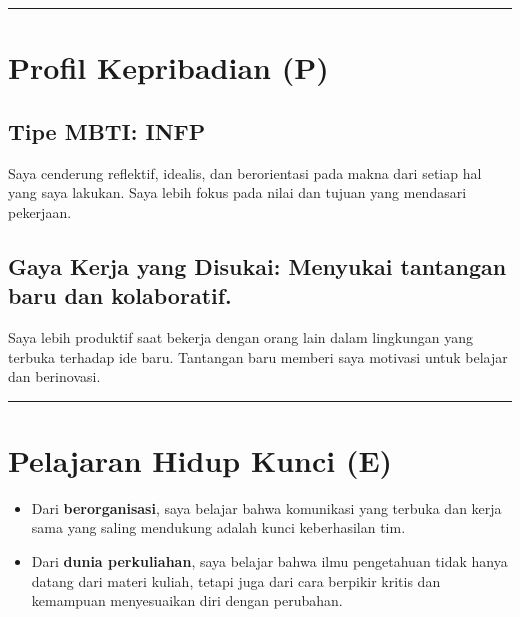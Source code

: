 \documentclass[
  letterpaper,
  DIV=11,
  numbers=noendperiod]{scrreprt}
\providecommand{\tightlist}{%
  \setlength{\itemsep}{0pt}\setlength{\parskip}{0pt}}
\begin{document}
\begin{center}\rule{0.5\linewidth}{0.5pt}\end{center}

\section{Profil Kepribadian (P)}\label{profil-kepribadian-p}

\subsection*{\texorpdfstring{\textbf{Tipe MBTI:}
INFP}{Tipe MBTI: INFP}}\label{tipe-mbti-infp}

Saya cenderung reflektif, idealis, dan berorientasi pada makna dari
setiap hal yang saya lakukan. Saya lebih fokus pada nilai dan tujuan
yang mendasari pekerjaan.

\subsection*{\texorpdfstring{\textbf{Gaya Kerja yang Disukai:} Menyukai
tantangan baru dan
kolaboratif.}{Gaya Kerja yang Disukai: Menyukai tantangan baru dan kolaboratif.}}\label{gaya-kerja-yang-disukai-menyukai-tantangan-baru-dan-kolaboratif.}

Saya lebih produktif saat bekerja dengan orang lain dalam lingkungan
yang terbuka terhadap ide baru. Tantangan baru memberi saya motivasi
untuk belajar dan berinovasi.

\begin{center}\rule{0.5\linewidth}{0.5pt}\end{center}

\section{Pelajaran Hidup Kunci (E)}\label{pelajaran-hidup-kunci-e}

\begin{itemize}
\tightlist
\item
  Dari \textbf{berorganisasi}, saya belajar bahwa komunikasi yang
  terbuka dan kerja sama yang saling mendukung adalah kunci keberhasilan
  tim.
\item
  Dari \textbf{dunia perkuliahan}, saya belajar bahwa ilmu pengetahuan
  tidak hanya datang dari materi kuliah, tetapi juga dari cara berpikir
  kritis dan kemampuan menyesuaikan diri dengan perubahan.
\end{itemize}
\end{document}
